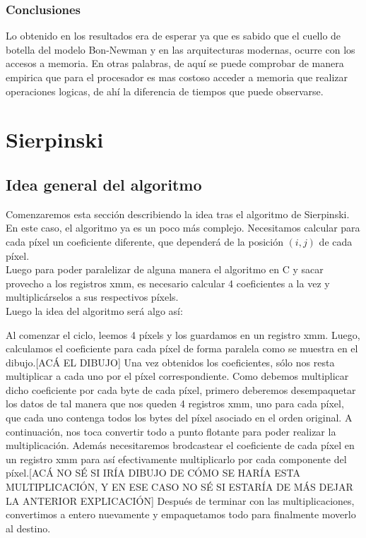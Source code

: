 \documentclass[a4paper]{article}
\begin{document}
\subsubsection{Conclusiones}

Lo obtenido en los resultados era de esperar ya que es sabido que el cuello de botella del modelo Bon-Newman y en las arquitecturas modernas, ocurre con los accesos a memoria. En otras palabras, de aquí se puede comprobar de manera empirica que para el procesador es mas costoso acceder a memoria que realizar operaciones logicas, de ahí la diferencia de tiempos que puede observarse. 

\newpage
\section{Sierpinski}

\subsection{Idea general del algoritmo}

Comenzaremos esta sección describiendo la idea tras el algoritmo de Sierpinski. En este caso, el algoritmo ya es un poco más complejo. Necesitamos calcular para cada píxel un coeficiente diferente, que dependerá de la posición $(i,j)$ de cada píxel.
\\
Luego para poder paralelizar de alguna manera el algoritmo en C y sacar provecho a los registros xmm, es necesario calcular 4 coeficientes a la vez y multiplicárselos a sus respectivos píxels.
\\
Luego la idea del algoritmo será algo así:

Al comenzar el ciclo, leemos 4 píxels y los guardamos en un registro xmm. Luego, calculamos el coeficiente para cada píxel de forma paralela como se muestra en el dibujo.[ACÁ EL DIBUJO] 
Una vez obtenidos los coeficientes, sólo nos resta multiplicar a cada uno por el píxel correspondiente. Como debemos multiplicar dicho coeficiente por cada byte de cada píxel, primero deberemos desempaquetar los datos de tal manera que nos queden 4 registros xmm, uno para cada píxel, que cada uno contenga todos los bytes del píxel asociado en el orden original. A continuación, nos toca convertir todo a punto flotante para poder realizar la multiplicación. Además necesitaremos brodcastear el coeficiente de cada píxel en un registro xmm para así efectivamente multiplicarlo por cada componente del píxel.[ACÁ NO SÉ SI IRÍA DIBUJO DE CÓMO SE HARÍA ESTA MULTIPLICACIÓN, Y EN ESE CASO NO SÉ SI ESTARÍA DE MÁS DEJAR LA ANTERIOR EXPLICACIÓN] Después de terminar con las multiplicaciones, convertimos a entero nuevamente y empaquetamos todo para finalmente moverlo al destino.
\end{document}
